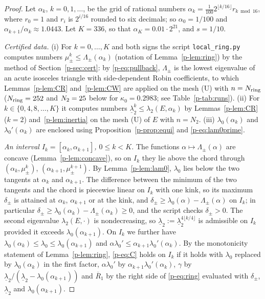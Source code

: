 \documentclass[11pt]{article}
\theoremstyle{remark}
\begin{document}
\begin{proof}
Let $\alpha_k$, $k=0,1,\dots$, be the grid of rational numbers
$\alpha_k=\frac1{100}2^{\lfloor k/16\rfloor}r_{k\bmod16}$, where $r_0=1$ and $r_i$ is $2^{i/16}$
rounded to six decimals; so $\alpha_0=1/100$ and $\alpha_{k+1}/\alpha_k\approx1.0443$. Let
$K=336$, so that $\alpha_K=0.01\cdot2^{21}$, and $s=1/10$.

\emph{Certified data.} (i) For $k=0,\dots,K$ and both signs the script \texttt{local\_ring.py}
computes numbers $\mu_\pm^k\le\Lambda_\pm(\alpha_k)$ (notation of Lemma~\ref{p-lem:ring}) by the
method of Section~\ref{p-sec:cert}: by \eqref{p-eq:pullback}, $\Lambda_\pm$ is the lowest
eigenvalue of an acute isosceles triangle with side-dependent Robin coefficients, to which
Lemmas~\ref{p-lem:CR} and~\ref{p-lem:CW} are applied on the mesh (U) with $n=N_{\rm ring}$
($N_{\rm ring}=252$ and $N_2=25$ below for $\kappa_0=0.2983$; see Table~\ref{p-tab:runs}).
(ii) For $k\in\{0,4,8,\dots,K\}$ it computes numbers $\underline\lambda_2^k\le\lambda_2(E,\alpha_k)$
by Lemmas~\ref{p-lem:CR} ($k=2$) and~\ref{p-lem:inertia} on the mesh (U) of $E$ with $n=N_2$.
(iii) $\lambda_0(\alpha_k)$ and $\lambda_0'(\alpha_k)$ are enclosed using
Proposition~\ref{p-prop:equi} and \eqref{p-eq:lam0prime}.

\emph{An interval $I_k=[\alpha_k,\alpha_{k+1}]$, $0\le k<K$.} The functions
$\alpha\mapsto\Lambda_\pm(\alpha)$ are concave (Lemma~\ref{p-lem:concave}), so on $I_k$ they lie
above the chord through $(\alpha_k,\mu_\pm^k)$, $(\alpha_{k+1},\mu_\pm^{k+1})$. By
Lemma~\ref{p-lem:lam0}, $\lambda_0$ lies below the two tangents at $\alpha_k$ and $\alpha_{k+1}$.
The difference between the minimum of the two tangents and the chord is piecewise linear on
$I_k$ with one kink, so its maximum $\delta_\pm$ is attained at $\alpha_k$, $\alpha_{k+1}$ or at
the kink, and $\delta_\pm\ge\lambda_0(\alpha)-\Lambda_\pm(\alpha)$ on $I_k$; in particular
$\delta_\pm\ge\lambda_0(\alpha_k)-\Lambda_\pm(\alpha_k)\ge0$, and the script checks $\delta_\pm>0$. The second
eigenvalue $\lambda_2(E,\cdot)$ is nondecreasing, so
$\underline\lambda_2:=\underline\lambda_2^{4\lfloor k/4\rfloor}$ is admissible on $I_k$ provided
it exceeds $\lambda_0(\alpha_{k+1})$. On $I_k$ we further have
$\lambda_0(\alpha_k)\le\lambda_0\le\lambda_0(\alpha_{k+1})$ and
$\alpha\lambda_0'\le\alpha_{k+1}\lambda_0'(\alpha_k)$. By the monotonicity statement of
Lemma~\ref{p-lem:ring}, \eqref{p-eq:C} holds on $I_k$ if it holds with $\lambda_0$ replaced by
$\lambda_0(\alpha_k)$ in the first factor, $\alpha\lambda_0'$ by
$\alpha_{k+1}\lambda_0'(\alpha_k)$, $\gamma$ by
$\underline\lambda_2/(\underline\lambda_2-\lambda_0(\alpha_{k+1}))$ and $\overline R_1$ by the
right side of \eqref{p-eq:ring} evaluated with $\delta_\pm$, $\underline\lambda_2$ and
$\lambda_0(\alpha_{k+1})$.


\end{proof}
\end{document}

